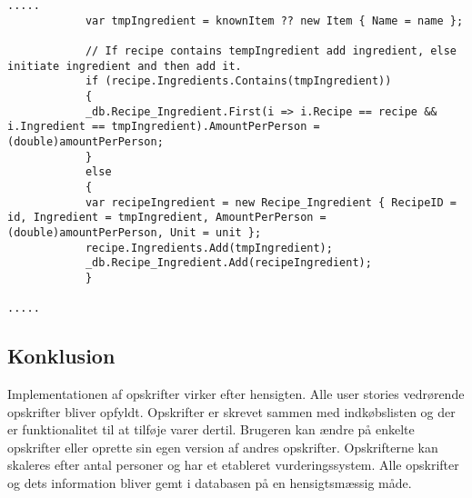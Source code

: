 \begin{lstlisting}[caption="Udklip fra AddIngredient som opretter og tilføjer ingredienser til en specifik opskrift - Her er vist hvad der er forskel fra AddItem i ShoppingListsController"]
.....
            var tmpIngredient = knownItem ?? new Item { Name = name };
            
            // If recipe contains tempIngredient add ingredient, else initiate ingredient and then add it.
            if (recipe.Ingredients.Contains(tmpIngredient))
            {
            _db.Recipe_Ingredient.First(i => i.Recipe == recipe && i.Ingredient == tmpIngredient).AmountPerPerson = (double)amountPerPerson;
            }
            else
            {
            var recipeIngredient = new Recipe_Ingredient { RecipeID = id, Ingredient = tmpIngredient, AmountPerPerson = (double)amountPerPerson, Unit = unit };
            recipe.Ingredients.Add(tmpIngredient);
            _db.Recipe_Ingredient.Add(recipeIngredient);
            }
            
.....
\end{lstlisting}


\subsection{Konklusion}
Implementationen af opskrifter virker efter hensigten. 
Alle user stories vedrørende opskrifter bliver opfyldt. 
Opskrifter er skrevet sammen med indkøbslisten og der er funktionalitet til at tilføje varer dertil. Brugeren kan ændre på enkelte opskrifter eller oprette sin egen version af andres opskrifter. 
Opskrifterne kan skaleres efter antal personer og har et etableret vurderingssystem. 
Alle opskrifter og dets information bliver gemt i databasen på en hensigtsmæssig måde.
